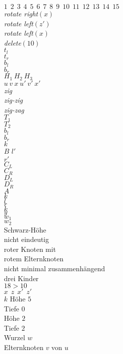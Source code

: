 \documentclass[a4paper,12pt]{article}
\begin{document}
$1~~2~~3~~4~~5~~6~~7~~8~~9~~10~~11~~12~~13~~14~~15$  \\
\textit{rotate right}$\left(x\right)$\\
\textit{rotate left}$\left(z'\right)$\\
\textit{rotate left}$\left(x\right)$\\
\textit{delete}$\left(10\right)$\\
$t_l$\\
$t_r$\\
$b_l$\\
$b_r$\\
$H_1  ~H_2 ~ H_3$\\
$u  ~v ~  x ~ u'  ~v' ~  x' $\\
\textit{zig}\\
\textit{zig-zig}\\
\textit{zig-zag}\\
$T_1$\\
$T_2$\\
$b_l$\\
$b_r$\\
$k$\\
$B$
$l'$\\
$r'$\\
$C_L$\\
$C_R$\\
$D_L$\\
$D_R$\\
$A$\\
$k$\\
$l$\\
$r$\\
$k$\\
$y$\\
$w_1$\\
$w_2$\\
\color{Red}
Schwarz-Höhe\\ nicht eindeutig\\
roter Knoten mit\\ rotem Elternknoten\\ 
nicht minimal zusammenhängend\\
drei Kinder\\
$18 > 10$\\
\color{ForestGreen}   
$x~~z~~x'~~z'$\\
$k$
Höhe $5$\\
Tiefe $0$\\
Höhe $2$\\
Tiefe $2$\\
Wurzel $w$\\
Elternknoten $v$ von $u$\\
\end{document}
